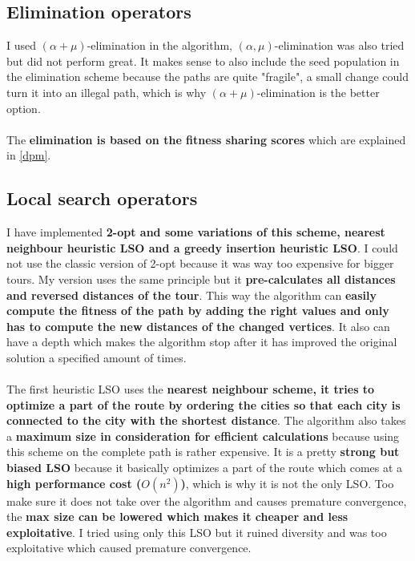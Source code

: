 \documentclass[a4paper,10pt]{article}
\begin{document}
\subsection{Elimination operators}
I used $(\alpha + \mu)$-elimination in the algorithm, $(\alpha, \mu)$-elimination was also tried but did not perform great. It makes sense to also include the seed population in the elimination scheme because the paths are quite "fragile", a small change could turn it into an illegal path, which is why $(\alpha + \mu)$-elimination is the better option. 
\\\\
The \textbf{elimination is based on the fitness sharing scores} which are explained in \ref{dpm}.

\subsection{Local search operators}
\label{LSO}
I have implemented \textbf{2-opt and some variations of this scheme, nearest neighbour heuristic LSO and a greedy insertion heuristic LSO}. I could not use the classic version of 2-opt because it was way too expensive for bigger tours. My version uses the same principle but it \textbf{pre-calculates all distances and reversed distances of the tour}. This way the algorithm can \textbf{easily compute the  fitness of the path by adding the right values and only has to compute the new distances of the changed vertices}. It also can have a depth which makes the algorithm stop after it has improved the original solution a specified amount of times.
\\\\
The first heuristic LSO uses the \textbf{nearest neighbour scheme, it tries to optimize a part of the route by ordering the cities so that each city is connected to the city with the shortest distance}. The algorithm also takes a \textbf{maximum size in consideration for efficient calculations} because using this scheme on the complete path is rather expensive. It is a pretty \textbf{strong but biased LSO} because it basically optimizes a part of the route which comes at a \textbf{high performance cost ($O(n^2)$)}, which is why it is not the only LSO. Too make sure it does not take over the algorithm and causes premature convergence, the \textbf{max size can be lowered which makes it cheaper and less exploitative}. I tried using only this LSO but it ruined diversity and was too exploitative which caused premature convergence.
\\\\
\end{document}
